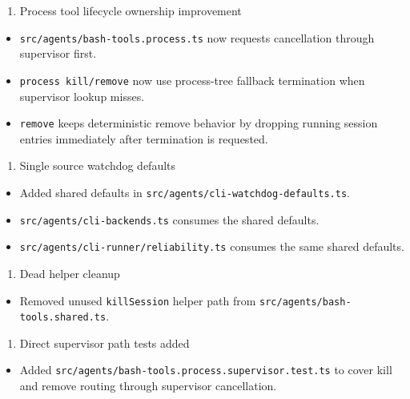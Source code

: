 \begin{enumerate}
  \item Process tool lifecycle ownership improvement
\end{enumerate}


\begin{itemize}
  \item \texttt{src/agents/bash-tools.process.ts} now requests cancellation through supervisor first.
  \item \texttt{process kill/remove} now use process-tree fallback termination when supervisor lookup misses.
  \item \texttt{remove} keeps deterministic remove behavior by dropping running session entries immediately after termination is requested.
\end{itemize}


\begin{enumerate}
  \item Single source watchdog defaults
\end{enumerate}


\begin{itemize}
  \item Added shared defaults in \texttt{src/agents/cli-watchdog-defaults.ts}.
  \item \texttt{src/agents/cli-backends.ts} consumes the shared defaults.
  \item \texttt{src/agents/cli-runner/reliability.ts} consumes the same shared defaults.
\end{itemize}


\begin{enumerate}
  \item Dead helper cleanup
\end{enumerate}


\begin{itemize}
  \item Removed unused \texttt{killSession} helper path from \texttt{src/agents/bash-tools.shared.ts}.
\end{itemize}


\begin{enumerate}
  \item Direct supervisor path tests added
\end{enumerate}


\begin{itemize}
  \item Added \texttt{src/agents/bash-tools.process.supervisor.test.ts} to cover kill and remove routing through supervisor cancellation.
\end{itemize}


